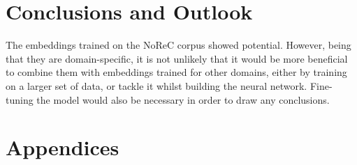 \documentclass{acl2020}
\begin{document}
\section{Conclusions and Outlook}
\label{sec:conclusion}

The embeddings trained on the NoReC corpus showed potential. However, being that they are domain-specific, it is not unlikely that it would be more beneficial to combine them with embeddings trained for other domains, either by training on a larger set of data, or tackle it whilst building the neural network. Fine-tuning the model would also be necessary in order to draw any conclusions.




\appendix

\section{Appendices}
\label{sec:appendix}
\end{document}
